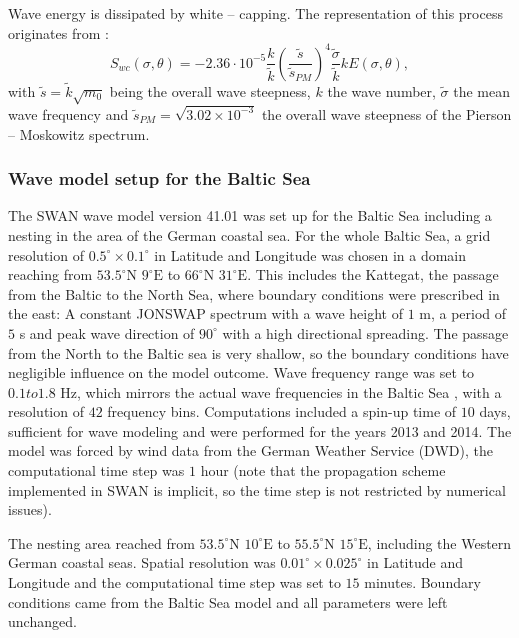 Wave energy is dissipated by white -- capping. The representation of this process originates from \citep[][]{hasselmann1974}:
\begin{equation}
 S_{wc} (\sigma, \theta ) = - 2.36 \cdot 10^{-5} \frac{k}{\tilde{k}} \left( \frac{\tilde{s}}{\tilde{s}_{PM}} \right)^4 \frac{\tilde{\sigma}}{\tilde{k}} k E(\sigma, \theta),
\end{equation}
with $\tilde{s} = \tilde{k} \sqrt{m_0}$ being the overall wave steepness, $k$ the wave number, $\tilde{\sigma}$ the mean wave frequency and $\tilde{s}_{PM} = \sqrt{3.02 \times 10^{-3}}$ the overall wave steepness of the Pierson -- Moskowitz spectrum.


\subsubsection{Wave model setup for the Baltic Sea}\label{balticswan}

The SWAN wave model version 41.01 was set up for the Baltic Sea including a nesting in the area of the German coastal sea. For the whole Baltic Sea, a grid resolution of $0.5^\circ \times 0.1^\circ $ in Latitude and Longitude was chosen in a domain reaching from $53.5^\circ \text{N } 9^\circ \text{E}$ to $66^\circ \text{N } 31^\circ \text{E}$. This includes the Kattegat, the passage from the Baltic to the North Sea, where boundary conditions were prescribed in the east: A constant JONSWAP spectrum with a wave height of $1$ m, a period of $5$ s and peak wave direction of $90^\circ$ with a high directional spreading. The passage from the North to the Baltic sea is very shallow, so the boundary conditions have negligible influence on the model outcome. Wave frequency range was set to $0.1 to 1.8 \text{ Hz}$, which mirrors the actual wave frequencies in the Baltic Sea \citep[][]{balticsea}, with a resolution of $42$ frequency bins. Computations included a spin-up time of $10$ days, sufficient for wave modeling and were performed for the years 2013 and 2014. The model was forced by wind data from the German Weather Service (DWD), the computational time step was $1$ hour (note that the propagation scheme implemented in SWAN is implicit, so the time step is not restricted by numerical issues). 

The nesting area reached from $53.5^\circ \text{N } 10^\circ \text{E}$ to $55.5^\circ \text{N } 15^\circ \text{E}$, including the Western German coastal seas. Spatial resolution was $0.01^\circ \times 0.025^\circ $ in Latitude and Longitude and the computational time step was set to $15$ minutes. Boundary conditions came from the Baltic Sea model and all parameters were left unchanged.

